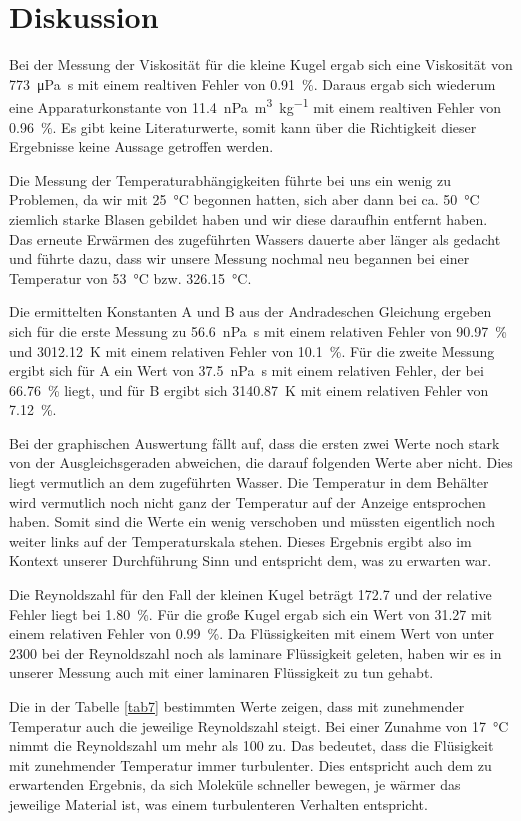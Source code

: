\section{Diskussion}
\label{sec:Diskussion}

Bei der Messung der Viskosität für die kleine Kugel ergab sich eine Viskosität von \SI{773}{\micro\pascal\second} mit einem realtiven Fehler von \SI{0.91}{\percent}.
Daraus ergab sich wiederum eine Apparaturkonstante von \SI{11.4}{\nano\pascal\cubic\meter\per\kilo\gram} mit einem realtiven Fehler von \SI{0.96}{\percent}. 
Es gibt keine Literaturwerte, somit kann über die Richtigkeit dieser Ergebnisse keine Aussage getroffen werden. 

Die Messung der Temperaturabhängigkeiten führte bei uns ein wenig zu Problemen, da wir mit \SI{25}{\degreeCelsius} begonnen hatten, sich aber dann bei ca. \SI{50}{\degreeCelsius} ziemlich starke Blasen gebildet haben und wir diese daraufhin entfernt haben. Das erneute Erwärmen des zugeführten Wassers dauerte aber länger als gedacht und führte dazu, dass wir unsere Messung nochmal neu begannen bei einer Temperatur von \SI{53}{\degreeCelsius} bzw. \SI{326.15}{\degreeCelsius}. 

Die ermittelten Konstanten A und B aus der Andradeschen Gleichung ergeben sich für die erste Messung zu \SI{56.6}{\nano\pascal\second} mit einem relativen Fehler von \SI{90.97}{\percent} und \SI{3012.12}{\kelvin} mit einem relativen Fehler von \SI{10.1}{\percent}. Für die zweite Messung ergibt sich für A ein Wert von \SI{37.5}{\nano\pascal\second} mit einem relativen Fehler, der bei \SI{66.76}{\percent} liegt, und für B ergibt sich \SI{3140.87}{\kelvin} mit einem relativen Fehler von \SI{7.12}{\percent}. 

Bei der graphischen Auswertung fällt auf, dass die ersten zwei Werte noch stark von der Ausgleichsgeraden abweichen, die darauf folgenden Werte aber nicht. Dies liegt vermutlich an dem zugeführten Wasser. Die Temperatur in dem Behälter wird vermutlich noch nicht ganz der Temperatur auf der Anzeige entsprochen haben. Somit sind die Werte ein wenig verschoben und müssten eigentlich noch weiter links auf der Temperaturskala stehen. Dieses Ergebnis ergibt also im Kontext unserer Durchführung Sinn und entspricht dem, was zu erwarten war. 

Die Reynoldszahl für den Fall der kleinen Kugel beträgt \num{172.7} und der relative Fehler liegt bei \SI{1.80}{\percent}. Für die große Kugel ergab sich ein Wert von \num{31.27} mit einem relativen Fehler von \SI{0.99}{\percent}. Da Flüssigkeiten mit einem Wert von unter 2300 bei der Reynoldszahl noch als laminare Flüssigkeit geleten, haben wir es in unserer Messung auch mit einer laminaren Flüssigkeit zu tun gehabt. 

Die in der Tabelle \ref{tab7} bestimmten Werte zeigen, dass mit zunehmender Temperatur auch die jeweilige Reynoldszahl steigt. Bei einer Zunahme von \SI{17}{\degreeCelsius} nimmt die Reynoldszahl um mehr als \num{100} zu. Das bedeutet, dass die Flüsigkeit mit zunehmender Temperatur immer turbulenter. Dies entspricht auch dem zu erwartenden Ergebnis, da sich Moleküle schneller bewegen, je wärmer das jeweilige Material ist, was einem turbulenteren Verhalten entspricht. 



